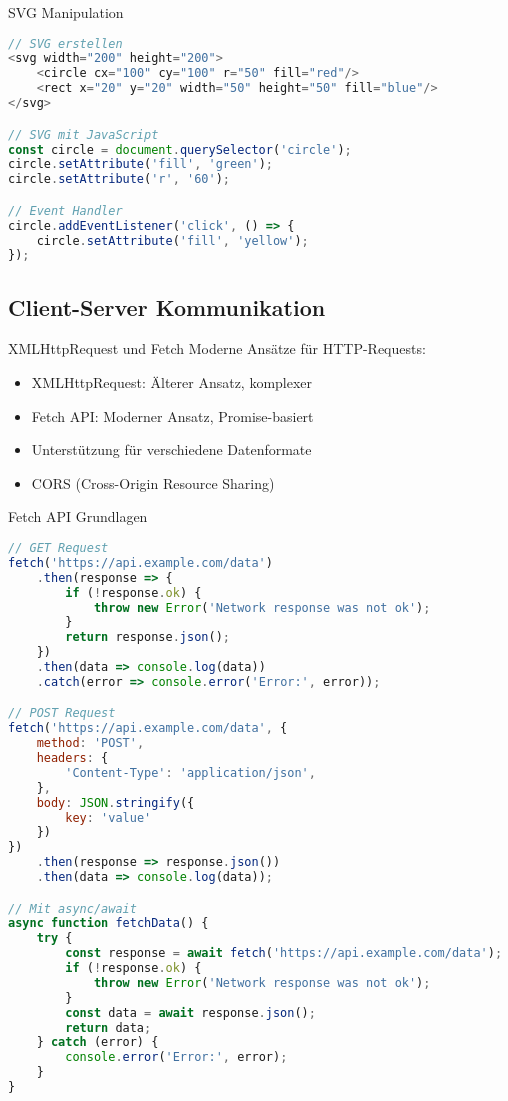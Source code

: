 \begin{KR}{SVG Manipulation}
\begin{lstlisting}[language=JavaScript, style=basesmol]
// SVG erstellen
<svg width="200" height="200">
    <circle cx="100" cy="100" r="50" fill="red"/>
    <rect x="20" y="20" width="50" height="50" fill="blue"/>
</svg>

// SVG mit JavaScript
const circle = document.querySelector('circle');
circle.setAttribute('fill', 'green');
circle.setAttribute('r', '60');

// Event Handler
circle.addEventListener('click', () => {
    circle.setAttribute('fill', 'yellow');
});
\end{lstlisting}
\end{KR}

\subsection{Client-Server Kommunikation}

\begin{concept}{XMLHttpRequest und Fetch}
    Moderne Ansätze für HTTP-Requests:
    \begin{itemize}
        \item XMLHttpRequest: Älterer Ansatz, komplexer
        \item Fetch API: Moderner Ansatz, Promise-basiert
        \item Unterstützung für verschiedene Datenformate
        \item CORS (Cross-Origin Resource Sharing)
    \end{itemize}
\end{concept}

\begin{KR}{Fetch API Grundlagen}
\begin{lstlisting}[language=JavaScript, style=basesmol]
// GET Request
fetch('https://api.example.com/data')
    .then(response => {
        if (!response.ok) {
            throw new Error('Network response was not ok');
        }
        return response.json();
    })
    .then(data => console.log(data))
    .catch(error => console.error('Error:', error));

// POST Request
fetch('https://api.example.com/data', {
    method: 'POST',
    headers: {
        'Content-Type': 'application/json',
    },
    body: JSON.stringify({
        key: 'value'
    })
})
    .then(response => response.json())
    .then(data => console.log(data));

// Mit async/await
async function fetchData() {
    try {
        const response = await fetch('https://api.example.com/data');
        if (!response.ok) {
            throw new Error('Network response was not ok');
        }
        const data = await response.json();
        return data;
    } catch (error) {
        console.error('Error:', error);
    }
}
\end{lstlisting}
\end{KR}

